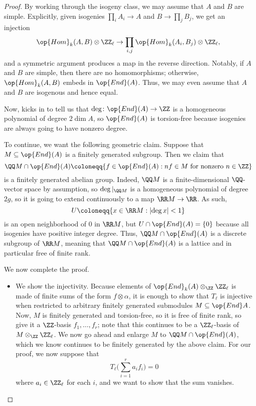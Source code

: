 \documentclass[../notes.tex]{subfiles}
\begin{document}
\begin{proof}
	By working through the isogeny class, we may assume that $A$ and $B$ are simple. Explicitly, given isogenies $\prod_iA_i\to A$ and $B\to\prod_jB_j$, we get an injection
	\[\op{Hom}_k(A,B)\otimes\ZZ_\ell\to\prod_{i,j}\op{Hom}_k(A_i,B_j)\otimes\ZZ_\ell,\]
	and a symmetric argument produces a map in the reverse direction. Notably, if $A$ and $B$ are simple, then there are no homomorphisms; otherwise, $\op{Hom}_k(A,B)$ embeds in $\op{End}(A)$. Thus, we may even assume that $A$ and $B$ are isogenous and hence equal.

	Now,  kicks in to tell us that $\deg\colon\op{End}(A)\to\ZZ$ is a homogeneous polynomial of degree $2\dim A$, so $\op{End}(A)$ is torsion-free because isogenies are always going to have nonzero degree.

	To continue, we want the following geometric claim. Suppose that $M\subseteq\op{End}(A)$ is a finitely generated subgroup. Then we claim that
	\[\QQ M\cap\op{End}(A)\coloneqq\{f\in\op{End}(A):nf\in M\text{ for nonzero }n\in\ZZ\}\]
	is a finitely generated abelian group. Indeed, $\QQ M$ is a finite-dimensional $\QQ$-vector space by assumption, so $\deg|_{\QQ M}$ is a homogeneous polynomial of degree $2g$, so it is going to extend continuously to a map $\RR M\to\RR$. As such,
	\[U\coloneqq\{x\in\RR M:\left|\deg x\right|<1\}\]
	is an open neighborhood of $0$ in $\RR M$, but $U\cap\op{End}(A)=\{0\}$ because all isogenies have positive integer degree. Thus, $\QQ M\cap\op{End}(A)$ is a discrete subgroup of $\RR M$, meaning that $\QQ M\cap\op{End}(A)$ is a lattice and in particular free of finite rank.

	We now complete the proof.
	\begin{itemize}
		\item We show the injectivity. Because elements of $\op{End}_k(A)\otimes_\ZZ\ZZ_\ell$ is made of finite sums of the form $f\otimes\alpha$, it is enough to show that $T_\ell$ is injective when restricted to arbitrary finitely generated submodules $M\subseteq\op{End}A$. Now, $M$ is finitely generated and torsion-free, so it is free of finite rank, so give it a $\ZZ$-basis $f_1,\ldots,f_r$; note that this continues to be a $\ZZ_\ell$-basis of $M\otimes_\ZZ\ZZ_\ell$. We now go ahead and enlarge $M$ to $\QQ M\cap\op{End}(A)$, which we know continues to be finitely generated by the above claim. For our proof, we now suppose that
		\[T_\ell\Bigg(\sum_{i=1}^ra_if_i\Bigg)=0\]
		where $a_i\in\ZZ_\ell$ for each $i$, and we want to show that the sum vanishes.


\end{itemize}
\end{proof}
\end{document}

